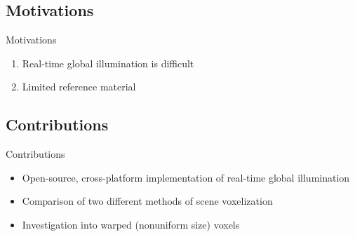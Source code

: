 \documentclass[10pt]{beamer}
\begin{document}
\subsection{Motivations}
\begin{frame}{Motivations}
  \begin{enumerate}
    \item Real-time global illumination is difficult %
    \item Limited reference material
  \end{enumerate}
\end{frame}

\subsection{Contributions}
\begin{frame}{Contributions}
  \begin{itemize}
    \item Open-source, cross-platform implementation of real-time global illumination %
    \item Comparison of two different methods of scene voxelization %
    \item Investigation into warped (nonuniform size) voxels %
  \end{itemize}
\end{frame}
\end{document}
